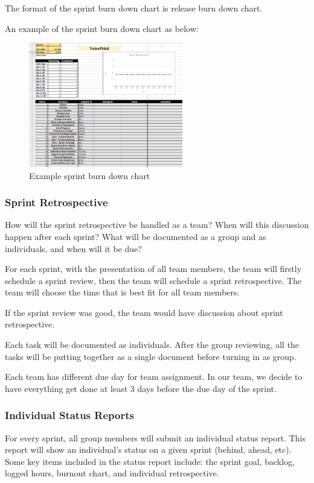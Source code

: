The format of the sprint burn down chart is release burn down chart.

An example of the sprint burn down chart as below:

\begin{figure}[h!]
	\centering
   	\includegraphics[width=0.6\textwidth]{images/Chart.png}
    \caption{Example sprint burn down chart}
\end{figure}

\subsubsection{Sprint Retrospective}
How will the sprint retrospective be handled as a team? When will this discussion happen after each sprint? What will be documented as a group and as individuals, and when will it be due?

For each sprint, with the presentation of all team members, the team will firstly schedule a sprint review, then the team will schedule a sprint retrospective. The team will choose the time that is best fit for all team members.

If the sprint review was good, the team would have discussion about sprint retrospective. 

Each task will be documented as individuals. After the group reviewing, all the tasks will be putting together as a single document before turning in as group.

Each team has different due day for team assignment. In our team, we decide to have everything get done at least 3 days before the due day of the sprint.

\subsubsection{Individual Status Reports}
For every sprint, all group members will submit an individual status report. This report will show an individual's status on a given sprint (behind, ahead, etc). Some key items included in the status report include: the sprint goal, backlog, logged hours, burnout chart, and individual retrospective.

